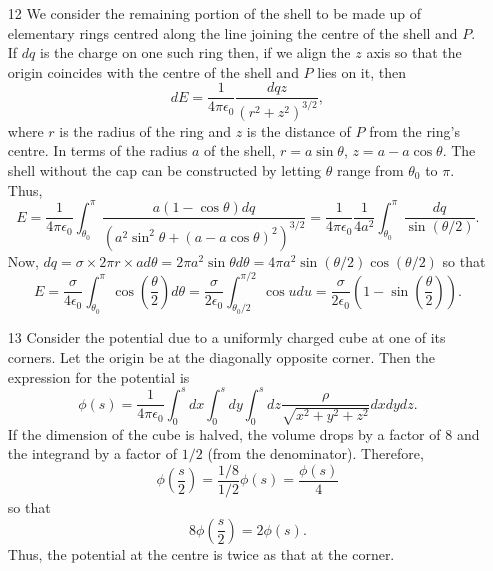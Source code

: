 \documentclass{article}
\newcommand{\ke}{\frac{1}{4\pi\epsilon_0}}
\begin{document}
\begin{enumerate}
\item[12] We consider the remaining portion of the shell to be made up of 
elementary rings centred along the line joining the centre of the shell and $P$.
If $dq$ is the charge on one such ring then, if we align the $z$ axis so that
the origin coincides with the centre of the shell and $P$ lies on it, then
\[
dE = \ke\frac{dq z}{(r^2 + z^2)^{3/2}},
\]
where $r$ is the radius of the ring and $z$ is the distance of $P$ from the 
ring's centre. In terms of the radius $a$ of the shell, $r = a\sin\theta$,
$z = a - a\cos\theta$. The shell without the cap can be constructed by letting
$\theta$ range from $\theta_0$ to $\pi$. Thus,
\[
E = \ke \int_{\theta_0}^\pi \frac{a(1 - \cos\theta) dq}{(a^2\sin^2\theta + (a - a\cos\theta)^2)^{3/2}}
= \ke \frac{1}{4a^2}\int_{\theta_0}^\pi \frac{dq}{\sin(\theta/2)}.
\]
Now, $dq = \sigma \times 2\pi r \times a d\theta = 2\pi a^2\sin\theta d\theta = 
4\pi a^2\sin(\theta/2)\cos(\theta/2)$ so that
\[
E = \frac{\sigma}{4\epsilon_0}\int_{\theta_0}^\pi\cos\left(\frac{\theta}{2}\right)d\theta
= \frac{\sigma}{2\epsilon_0}\int_{\theta_0/2}^{\pi/2}\cos u du = \frac{\sigma}{2\epsilon_0}
\left(1 - \sin\left(\frac{\theta}{2}\right)\right).
\]

\item[13] Consider the potential due to a uniformly charged cube at one of its 
corners. Let the origin be at the diagonally opposite corner. Then the expression
for the potential is
\[
\phi(s) = \ke\int_0^s dx \int_0^s dy \int_0^s dz \frac{\rho}{\sqrt{x^2 + y^2 + z^2}}dxdydz.
\]
If the dimension of the cube is halved, the volume drops by a factor of $8$ and the
integrand by a factor of $1/2$ (from the denominator). Therefore,
\[
\phi\left(\frac{s}{2}\right) = \frac{1/8}{1/2}\phi(s) = \frac{\phi(s)}{4}
\]
so that
\[
8\phi\left(\frac{s}{2}\right) = 2\phi(s).
\]
Thus, the potential at the centre is twice as that at the corner.


\end{enumerate}
\end{document}
